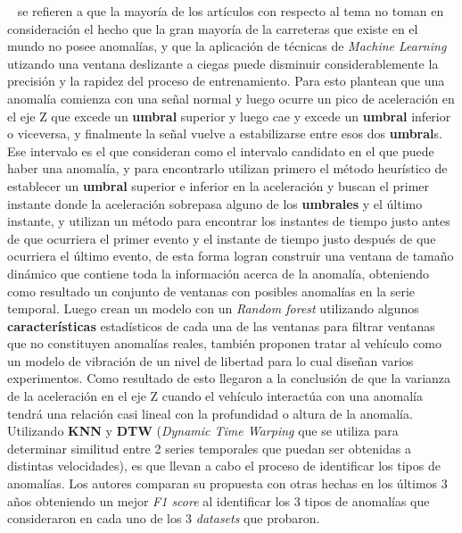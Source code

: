 		~ se refieren a que la mayoría de los artículos con respecto al tema no toman en consideración el hecho que la gran
		mayoría de la carreteras que existe en el mundo no posee anomalías, y que la aplicación de técnicas de \emph{Machine Learning} utizando una
		ventana deslizante a ciegas puede disminuir considerablemente la precisión y la rapidez del proceso de entrenamiento. Para esto plantean que
		una anomalía comienza con una señal normal y luego ocurre un pico de aceleración en el eje Z que excede un \textbf{umbral} superior y luego
		cae y excede un \textbf{umbral} inferior o viceversa, y finalmente la señal vuelve a estabilizarse entre esos dos \textbf{umbral}s. Ese
		intervalo es el que consideran como el intervalo candidato en el que puede haber una anomalía, y para encontrarlo utilizan primero el método
		heurístico de establecer un \textbf{umbral} superior e inferior en la aceleración y buscan el primer instante donde la aceleración sobrepasa
		alguno de los \textbf{umbrales} y el último instante, y utilizan un método para encontrar los instantes de tiempo justo antes de que ocurriera
		el primer evento y el instante de tiempo justo después de que ocurriera el último evento, de esta forma logran construir una ventana de tamaño
		dinámico que contiene toda la información acerca de la anomalía, obteniendo como resultado un conjunto de ventanas con posibles anomalías en
		la serie temporal. Luego crean un modelo con un \emph{Random forest} utilizando algunos \textbf{características} estadísticos de cada una de las ventanas
		para filtrar ventanas que no constituyen anomalías reales, también proponen tratar al vehículo como un modelo de vibración de un nivel de
		libertad para lo cual diseñan varios experimentos. Como resultado de esto llegaron a la conclusión de que la varianza de la aceleración en el
		eje Z cuando el vehículo interactúa con una anomalía tendrá una relación casi lineal con la profundidad o altura de la anomalía. Utilizando
		\textbf{KNN} y \textbf{DTW} (\emph{Dynamic Time Warping} que se utiliza para determinar similitud entre 2 series temporales que puedan ser
		obtenidas a distintas velocidades), es que llevan a cabo el proceso de identificar los tipos de anomalías. Los autores comparan su propuesta
		con otras hechas en los últimos 3 años obteniendo un mejor \emph{F1 score} al identificar los 3 tipos de anomalías que consideraron en cada
		uno de los 3 \emph{datasets} que probaron.\\

